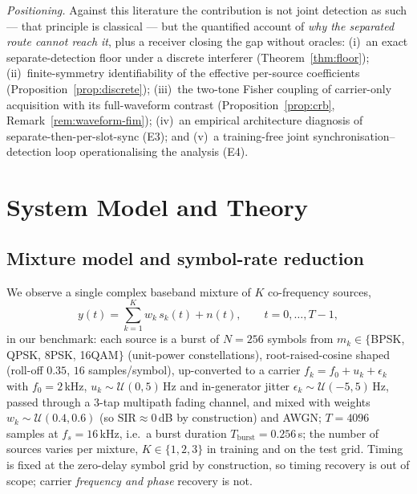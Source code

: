 \documentclass[journal]{IEEEtran}
\newcommand{\sir}{\mathrm{SIR}}
\begin{document}
\emph{Positioning.} Against this literature the contribution is not
joint detection as such --- that principle is classical --- but the
quantified account of \emph{why the separated route cannot reach it},
plus a receiver closing the gap without oracles: (i)~an exact
separate-detection floor under a discrete interferer
(Theorem~\ref{thm:floor}); (ii)~finite-symmetry identifiability of the
effective per-source coefficients (Proposition~\ref{prop:discrete});
(iii)~the two-tone Fisher coupling of carrier-only acquisition with its
full-waveform contrast (Proposition~\ref{prop:crb},
Remark~\ref{rem:waveform-fim}); (iv)~an empirical architecture
diagnosis of separate-then-per-slot-sync (E3); and (v)~a training-free
joint synchronisation--detection loop operationalising the analysis
(E4).

\section{System Model and Theory}
\label{sec:theory}

\subsection{Mixture model and symbol-rate reduction}
\label{sec:model}

We observe a single complex baseband mixture of $K$ co-frequency
sources,
\begin{equation}
  y(t) = \sum_{k=1}^{K} w_k\, s_k(t) + n(t), \qquad t = 0,\dots,T{-}1,
  \label{eq:mix}
\end{equation}
in our benchmark: each source is a
burst of $N{=}256$ symbols from $m_k \in \{$BPSK, QPSK, 8PSK, 16QAM$\}$
(unit-power constellations), root-raised-cosine shaped (roll-off $0.35$,
$16$ samples/symbol), up-converted to a carrier
$f_k = f_0 + u_k + \epsilon_k$ with $f_0 = 2$\,kHz, $u_k \sim
\mathcal{U}(0,5)$\,Hz and in-generator jitter
$\epsilon_k \sim \mathcal{U}(-5,5)$\,Hz, passed through a 3-tap
multipath fading channel, and mixed with weights
$w_k \sim \mathcal{U}(0.4, 0.6)$ (so $\sir \approx 0$\,dB by
construction) and AWGN; $T = 4096$ samples at $f_s = 16$\,kHz, i.e.\ a
burst duration $T_{\mathrm{burst}} = 0.256$\,s; the number of sources
varies per mixture, $K \in \{1,2,3\}$ in training and on the test grid.
Timing is fixed at the
zero-delay symbol grid by construction, so
timing recovery is out of scope; carrier \emph{frequency and phase}
recovery is not.
\end{document}
